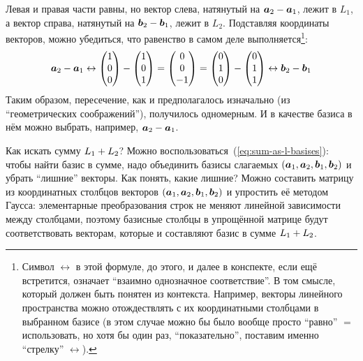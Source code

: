 \documentclass[a4paper,12pt]{article}
\begin{document}
  Левая и правая части равны, но вектор слева, натянутый на $\bds a_2 \hm- \bds a_1$, лежит в $L_1$, а вектор справа, натянутый на $\bds b_2 \hm- \bds b_1$, лежит в $L_2$.
  Подставляя координаты векторов, можно убедиться, что равенство в самом деле выполняется\footnote{Символ $\leftrightarrow$ в этой формуле, до этого, и далее в конспекте, если ещё встретится, означает ``взаимно однозначное соответствие''. В том смысле, который должен быть понятен из контекста. Например, векторы линейного пространства можно отождествлять с их координатными столбцами в выбранном базисе (в этом случае можно бы было вообще просто ``равно'' $=$ использовать, но хотя бы один раз, ``показательно'', поставим именно ``стрелку'' $\leftrightarrow$).}:
  \[
    \boldsymbol a_2 - \boldsymbol a_1
    \leftrightarrow \begin{pmatrix}1\\ 0\\ 0\end{pmatrix} - \begin{pmatrix}1\\ 0\\ 1\end{pmatrix}
    = \begin{pmatrix}0\\ 0\\ -1\end{pmatrix}
    = \begin{pmatrix}0\\ 1\\ 0\end{pmatrix} - \begin{pmatrix}0\\ 1\\ 1\end{pmatrix}
    \leftrightarrow \boldsymbol b_2 - \boldsymbol b_1
  \]
  Таким образом, пересечение, как и предполагалось изначально (из ``геометрических соображений''), получилось одномерным.
  И в качестве базиса в нём можно выбрать, например, $\bds a_2 \hm- \bds a_1$.
  
  \medskip
  
  Как искать сумму $L_1 \hm+ L_2$?
  Можно воспользоваться~(\ref{eq:sum-as-l-basises}): чтобы найти базис в сумме, надо объединить базисы слагаемых $(\boldsymbol a_1, \boldsymbol a_2, \boldsymbol b_1, \boldsymbol b_2)$ и убрать ``лишние'' векторы.
  Как понять, какие лишние?
  Можно составить матрицу из координатных столбцов векторов $(\boldsymbol a_1, \boldsymbol a_2, \boldsymbol b_1, \boldsymbol b_2)$ и упростить её методом Гаусса: элементарные преобразования строк не меняют линейной зависимости между столбцами, поэтому базисные столбцы в упрощённой матрице будут соответствовать векторам, которые и составляют базис в сумме $L_1 \hm+ L_2$.
  
\end{document}
